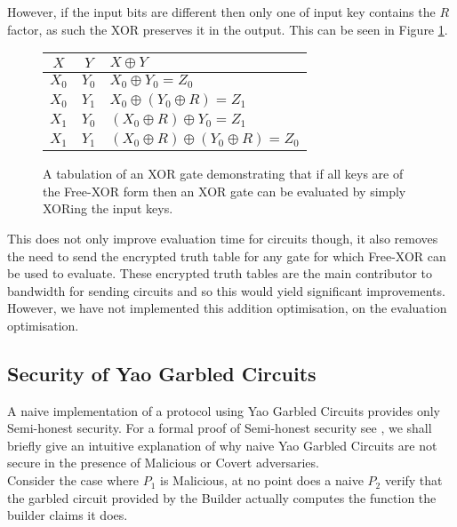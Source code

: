 \documentclass[ %
                    author={Nicholas Tutte},
                supervisor={Prof. Nigel Smart},
                    degree={MEng},
                     title={Secure Two Party Computation},
                  subtitle={A practical comparison of recent protocols},
                      type={Research - GG1K},
                      year={2015} ]{dissertation}
\begin{document}
				However, if the input bits are different then only one of input key contains the $R$ factor, as such the XOR preserves it in the output. This can be seen in Figure \ref{table:FREE_XOR_Demonstration}.
% 
				\begin{figure}[!ht]
					\begin{center}
						\begin{tabular}{c c | l }
							$X$ & $Y$ & $X \oplus Y$\\
							\hline
							$X_0$ & $Y_0$ & $X_0 \oplus Y_0 = Z_0$ \\
							$X_0$ & $Y_1$ & $X_0 \oplus (Y_0 \oplus R) = Z_1$ \\
							$X_1$ & $Y_0$ & $(X_0 \oplus R) \oplus Y_0 = Z_1$ \\
							$X_1$ & $Y_1$ & $(X_0 \oplus R) \oplus (Y_0 \oplus R) = Z_0$ \\
						\end{tabular}
					\end{center}
					\caption{A tabulation of an XOR gate demonstrating that if all keys are of the Free-XOR form then an XOR gate can be evaluated by simply XORing the input keys. \label{table:FREE_XOR_Demonstration}}
				\end{figure}

				This does not only improve evaluation time for circuits though, it also removes the need to send the encrypted truth table for any gate for which Free-XOR can be used to evaluate. These encrypted truth tables are the main contributor to bandwidth for sending circuits and so this would yield significant improvements. However, we have not implemented this addition optimisation, on the evaluation optimisation.

		\subsection{Security of Yao Garbled Circuits} \label{sub:YaoSecurity}
			A naive implementation of a protocol using Yao Garbled Circuits provides only Semi-honest security. For a formal proof of Semi-honest security see \cite{ProofOfYaoSecurity}, we shall briefly give an intuitive explanation of why naive Yao Garbled Circuits are not secure in the presence of Malicious or Covert adversaries.\\

			Consider the case where $P_1$ is Malicious, at no point does a naive $P_2$ verify that the garbled circuit provided by the Builder actually computes the function the builder claims it does.\\
\end{document}
